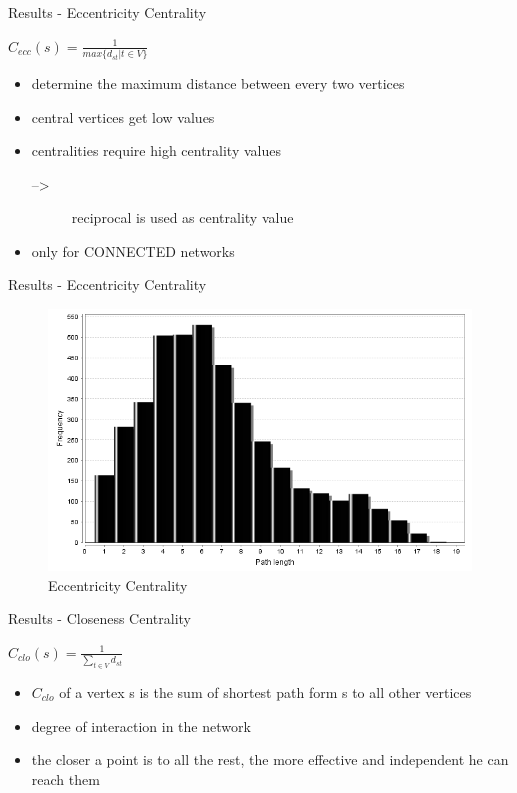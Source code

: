 \begin{frame}{Results - Eccentricity Centrality}
	\begin{definition}
		$C_{ecc}(s) = \frac{1}{max\{d_{st}|t\in V\}}$
	\end{definition}
	\begin{itemize}
		\item determine the maximum distance between every two vertices
		\item central vertices get low values
		\item centralities require high centrality values
		\begin{description}
			\item[-->] reciprocal is used as centrality value
		\end{description}
		\item only for CONNECTED networks
	\end{itemize}
\end{frame}
\begin{frame}{Results - Eccentricity Centrality}
	\begin{figure}
		\includegraphics[scale=0.4]{inc/img/Glyco1/ShortPathLengthDistr.png}
	\caption{Eccentricity Centrality}
	\end{figure}
\end{frame}
\begin{frame}{Results - Closeness Centrality}
	\begin{definition}
		$C_{clo}(s) = \frac{1}{\sum\limits_{t\in V} d_{st}}$
	\end{definition}
	\begin{itemize}
		\item $C_{clo}$ of a vertex s is the sum of shortest path form s to all other vertices  
		\item degree of interaction in the network
		\item the closer a point is to all the rest, the more effective and independent he can reach them
	\end{itemize}
\end{frame}
